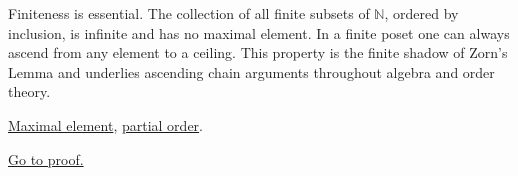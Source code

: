 \begin{remark*}[Interpretation]
Finiteness is essential.  The collection of all finite subsets of
$\mathbb{N}$, ordered by inclusion, is infinite and has no maximal
element.  In a finite poset one can always ascend from any element to
a ceiling.  This property is the finite shadow of Zorn's Lemma and
underlies ascending chain arguments throughout algebra and order theory.
\end{remark*}

\begin{remark*}[Dependencies]
\hyperref[def:maximal-element]{Maximal element},
\hyperref[def:partial-order]{partial order}.
\end{remark*}

\begin{remark*}[Proof]
\hyperref[prf:finite-poset-maximal]{Go to proof.}
\end{remark*}
